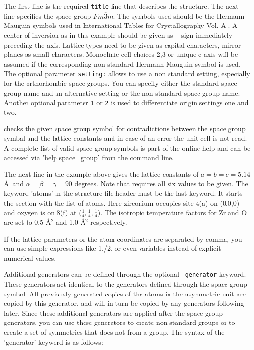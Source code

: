 The first line is the required {\tt title} line that describes the
structure. The next line specifies the space group
$Fm\overline{3}m$.  The symbols used should be the Hermann-Mauguin
symbols used in International Tables for Crystallography Vol.  A
\cite{tables}.  A center of inversion as in this example should be
given as {\tt -} sign immediately preceding the axis. Lattice types need
to be given as capital characters, mirror planes as small
characters.  Monoclinic cell choices 2,3 or unique c-axis will be
assumed if the corresponding non standard Hermann-Mauguin symbol is
used. The optional parameter {\tt setting:} allows to use a 
non standard setting, especially for the orthorhombic space groups. 
You can specify either the standard space group name and an 
alternative setting or the non standard space group name.
Another optional parameter {\tt 1} or {\tt 2} is used to differentiate
origin settings one and two. 

\Discus checks the given space group symbol for
contradictions between the space group symbal and the lattice 
constants and in case of an error
the unit cell is not read.  A complete list of valid space group
symbols is part of the online help and can be accessed via 'help
space\_group' from the \Discus command line.  

The next line in the
example above gives the lattice constants of $a=b=c=5.14$\AA \ and
$\alpha=\beta=\gamma=90$ degrees.  Note that \Discus requires
all six values to be given.  The keyword 'atoms' in the structure file
header must be the last keyword. It starts the section with the list of
atoms.  Here zirconium occupies site 4(a) on (0,0,0) and oxygen is
on 8(f) at ($\frac{1}{4}, \frac{1}{4}, \frac{1}{4}$).  The isotropic
temperature factors for Zr and O are set to 0.5 \AA$^{2}$ and 1.0
\AA$^{2}$ respectively. \par

If the lattice parameters or the atom coordinates are separated
by comma, you can use simple expressions like 1./2. or even 
variables instead of explicit numerical values. \par

Additional generators can be defined through the optional {\tt
generator} keyword.  These generators act identical to the
generators defined through the space group symbol.  All previously
generated copies of the atoms in the asymmetric unit are copied by
this generator, and will in turn be copied by any generators
following later.  Since these additional generators are applied
after the space group generators, you can use these generators to
create non-standard groups or to create a set of symmetries that
does not from a group. The syntax of the 'generator' keyword is as
follows:

